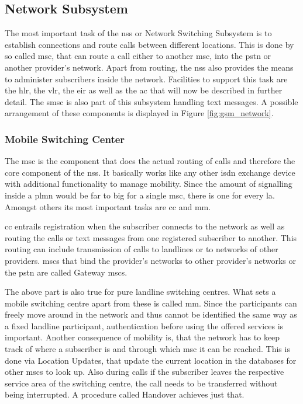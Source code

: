 \subsection{Network Subsystem}
\label{sec:nss}
The most important task of the \gls{nss} or Network Switching Subsystem is to establish connections and route calls between different locations.
This is done by so called \gls{msc}, that can route a call either to another \gls{msc}, into the \gls{pstn} or another provider's network.
Apart from routing, the \gls{nss} also provides the means to administer subscribers inside the network.
Facilities to support this task are the \gls{hlr}, the \gls{vlr}, the \gls{eir} as well as the \gls{ac} that will now be described in further detail.
The \gls{smsc} is also part of this subsystem handling text messages.
A possible arrangement of these components is displayed in Figure \ref{fig:gsm_network}.

\subsubsection{Mobile Switching Center}
The \gls{msc} is the component that does the actual routing of calls and therefore the core component of the \gls{nss}.
It basically works like any other \gls{isdn} exchange device with additional functionality to manage mobility.
Since the amount of signalling inside a \gls{plmn} would be far to big for a single \gls{msc}, there is one for every \gls{la}.
Amongst others its most important tasks are \gls{cc} and \gls{mm}.

\gls{cc} entrails registration when the subscriber connects to the network as well as routing the calls or text messages from one registered subscriber to another. 
This routing can include transmission of calls to landlines or to networks of other providers.
\glspl{msc} that bind the provider's networks to other provider's networks or the \gls{pstn} are called Gateway \glspl{msc}.

The above part is also true for pure landline switching centres.
What sets a mobile switching centre apart from these is called \gls{mm}.
Since the participants can freely move around in the network  and thus cannot be identified the same way as a fixed landline participant, authentication before using the offered services is important.
Another consequence of mobility is, that the network has to keep track of where a subscriber is and through which \gls{msc} it can be reached.
This is done via  Location Updates, that update the current location in the databases for other \glspl{msc} to look up.
Also during calls if the subscriber leaves the respective service area of the switching centre, the call needs to be transferred without being interrupted.
A procedure called Handover achieves just that.

